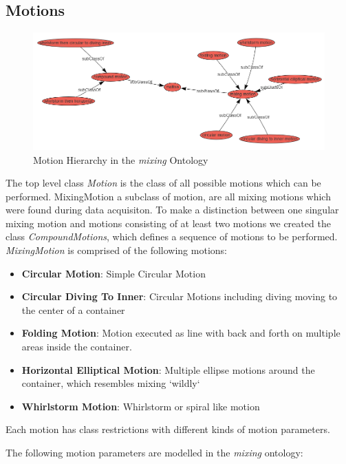 \subsection{Motions}
\begin{figure}[H]
    \includegraphics[scale=0.45]{Graphics/classHierarchy/motions_hierarchy.png}
    \centering
    \caption{Motion Hierarchy in the \textit{mixing} Ontology}
\end{figure}

The top level class \textit{Motion} is the class of all possible motions which can be performed. MixingMotion a subclass of motion, are all mixing motions 
which were found during data acquisiton. To make a distinction between one singular mixing motion and motions consisting of at least two motions
we created the class \textit{CompoundMotions}, which defines a sequence of motions to be performed.
\textit{MixingMotion} is comprised of the following motions:

\begin{itemize}
    \item \textbf{Circular Motion}: Simple Circular Motion
    \item \textbf{Circular Diving To Inner}: Circular Motions including diving moving to the center of a container
    \item \textbf{Folding Motion}: Motion executed as line with back and forth on multiple areas inside the container.
    \item \textbf{Horizontal Elliptical Motion}: Multiple ellipse motions around the container, which resembles mixing `wildly`
    \item \textbf{Whirlstorm Motion}: Whirlstorm or spiral like motion
\end{itemize}

Each motion has class restrictions with different kinds of motion parameters.

The following motion parameters are modelled in the \textit{mixing} ontology:

